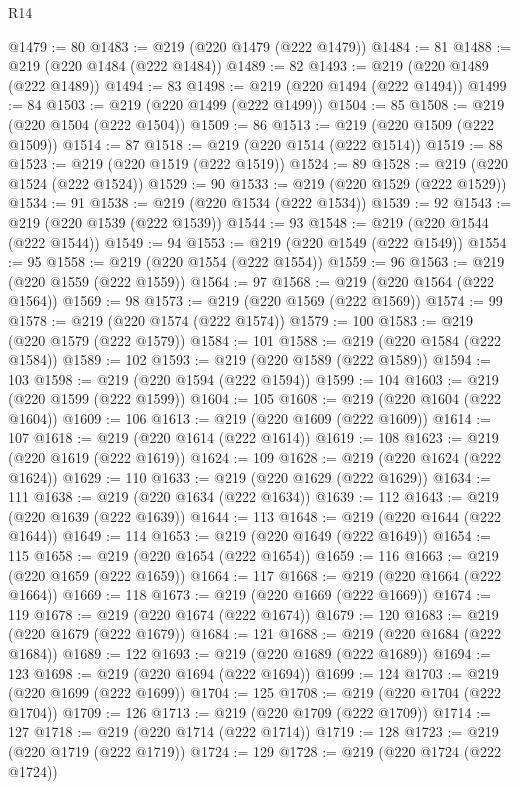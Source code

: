 \begin{lexlean}{R14}
\begin{coremodule}
@1479 := 80
@1483 := @219 (@220 @1479 (@222 @1479))
@1484 := 81
@1488 := @219 (@220 @1484 (@222 @1484))
@1489 := 82
@1493 := @219 (@220 @1489 (@222 @1489))
@1494 := 83
@1498 := @219 (@220 @1494 (@222 @1494))
@1499 := 84
@1503 := @219 (@220 @1499 (@222 @1499))
@1504 := 85
@1508 := @219 (@220 @1504 (@222 @1504))
@1509 := 86
@1513 := @219 (@220 @1509 (@222 @1509))
@1514 := 87
@1518 := @219 (@220 @1514 (@222 @1514))
@1519 := 88
@1523 := @219 (@220 @1519 (@222 @1519))
@1524 := 89
@1528 := @219 (@220 @1524 (@222 @1524))
@1529 := 90
@1533 := @219 (@220 @1529 (@222 @1529))
@1534 := 91
@1538 := @219 (@220 @1534 (@222 @1534))
@1539 := 92
@1543 := @219 (@220 @1539 (@222 @1539))
@1544 := 93
@1548 := @219 (@220 @1544 (@222 @1544))
@1549 := 94
@1553 := @219 (@220 @1549 (@222 @1549))
@1554 := 95
@1558 := @219 (@220 @1554 (@222 @1554))
@1559 := 96
@1563 := @219 (@220 @1559 (@222 @1559))
@1564 := 97
@1568 := @219 (@220 @1564 (@222 @1564))
@1569 := 98
@1573 := @219 (@220 @1569 (@222 @1569))
@1574 := 99
@1578 := @219 (@220 @1574 (@222 @1574))
@1579 := 100
@1583 := @219 (@220 @1579 (@222 @1579))
@1584 := 101
@1588 := @219 (@220 @1584 (@222 @1584))
@1589 := 102
@1593 := @219 (@220 @1589 (@222 @1589))
@1594 := 103
@1598 := @219 (@220 @1594 (@222 @1594))
@1599 := 104
@1603 := @219 (@220 @1599 (@222 @1599))
@1604 := 105
@1608 := @219 (@220 @1604 (@222 @1604))
@1609 := 106
@1613 := @219 (@220 @1609 (@222 @1609))
@1614 := 107
@1618 := @219 (@220 @1614 (@222 @1614))
@1619 := 108
@1623 := @219 (@220 @1619 (@222 @1619))
@1624 := 109
@1628 := @219 (@220 @1624 (@222 @1624))
@1629 := 110
@1633 := @219 (@220 @1629 (@222 @1629))
@1634 := 111
@1638 := @219 (@220 @1634 (@222 @1634))
@1639 := 112
@1643 := @219 (@220 @1639 (@222 @1639))
@1644 := 113
@1648 := @219 (@220 @1644 (@222 @1644))
@1649 := 114
@1653 := @219 (@220 @1649 (@222 @1649))
@1654 := 115
@1658 := @219 (@220 @1654 (@222 @1654))
@1659 := 116
@1663 := @219 (@220 @1659 (@222 @1659))
@1664 := 117
@1668 := @219 (@220 @1664 (@222 @1664))
@1669 := 118
@1673 := @219 (@220 @1669 (@222 @1669))
@1674 := 119
@1678 := @219 (@220 @1674 (@222 @1674))
@1679 := 120
@1683 := @219 (@220 @1679 (@222 @1679))
@1684 := 121
@1688 := @219 (@220 @1684 (@222 @1684))
@1689 := 122
@1693 := @219 (@220 @1689 (@222 @1689))
@1694 := 123
@1698 := @219 (@220 @1694 (@222 @1694))
@1699 := 124
@1703 := @219 (@220 @1699 (@222 @1699))
@1704 := 125
@1708 := @219 (@220 @1704 (@222 @1704))
@1709 := 126
@1713 := @219 (@220 @1709 (@222 @1709))
@1714 := 127
@1718 := @219 (@220 @1714 (@222 @1714))
@1719 := 128
@1723 := @219 (@220 @1719 (@222 @1719))
@1724 := 129
@1728 := @219 (@220 @1724 (@222 @1724))

\end{coremodule}
\end{lexlean}
